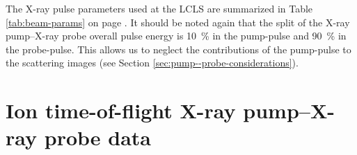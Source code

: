 %
The X-ray pulse parameters used at the LCLS are summarized in Table \ref{tab:beam-params} on page \pageref{tab:beam-params}. It should be noted again that the split of the X-ray pump--X-ray probe overall pulse energy is \SI{10}{\percent} in the pump-pulse and \SI{90}{\percent} in the probe-pulse. This allows us to neglect the contributions of the pump-pulse to the scattering images (see Section \ref{sec:pump--probe-considerations}).
%
%
\section{Ion time-of-flight X-ray pump--X-ray probe data}\label{sec:itof-pump--probe}
